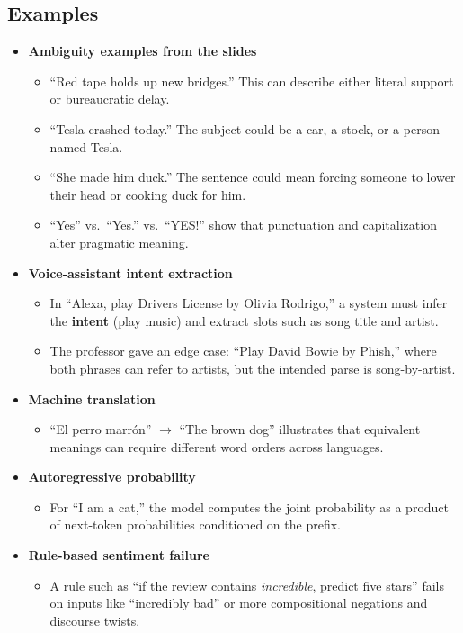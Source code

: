 \documentclass[11pt]{article}
\begin{document}
\subsection{Examples}
\begin{itemize}
    \item \textbf{Ambiguity examples from the slides}
    \begin{itemize}
        \item ``Red tape holds up new bridges.'' This can describe either literal support or bureaucratic delay.
        \item ``Tesla crashed today.'' The subject could be a car, a stock, or a person named Tesla.
        \item ``She made him duck.'' The sentence could mean forcing someone to lower their head or cooking duck for him.
        \item ``Yes'' vs.\ ``Yes.'' vs.\ ``YES!'' show that punctuation and capitalization alter pragmatic meaning.
    \end{itemize}
    \item \textbf{Voice-assistant intent extraction}
    \begin{itemize}
        \item In ``Alexa, play Drivers License by Olivia Rodrigo,'' a system must infer the \textbf{intent} (play music) and extract slots such as song title and artist.
        \item The professor gave an edge case: ``Play David Bowie by Phish,'' where both phrases can refer to artists, but the intended parse is song-by-artist.
    \end{itemize}
    \item \textbf{Machine translation}
    \begin{itemize}
        \item ``El perro marr\'on'' \(\rightarrow\) ``The brown dog'' illustrates that equivalent meanings can require different word orders across languages.
    \end{itemize}
    \item \textbf{Autoregressive probability}
    \begin{itemize}
        \item For ``I am a cat,'' the model computes the joint probability as a product of next-token probabilities conditioned on the prefix.
    \end{itemize}
    \item \textbf{Rule-based sentiment failure}
    \begin{itemize}
        \item A rule such as ``if the review contains \emph{incredible}, predict five stars'' fails on inputs like ``incredibly bad'' or more compositional negations and discourse twists.
    \end{itemize}
\end{itemize}
\end{document}
